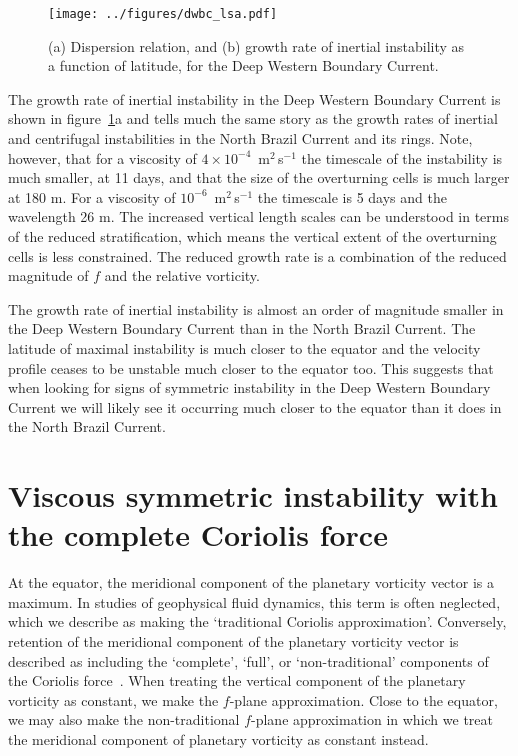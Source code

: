 \begin{figure}
    \centering
    \texttt{[image: ../figures/dwbc\_lsa.pdf]}
    \caption{(a) Dispersion relation, and (b) growth rate of inertial instability as a function of latitude, for the Deep Western Boundary Current.}
    \label{fig:lsaDWBC}
\end{figure}

The growth rate of inertial instability in the Deep Western Boundary Current is shown in figure~\ref{fig:lsaDWBC}a and tells much the same story as the growth rates of inertial and centrifugal instabilities in the North Brazil Current and its rings. Note, however, that for a viscosity of $4 \times 10^{-4}$~m$^2\,$s$^{-1}$ the timescale of the instability is much smaller, at 11 days, and that the size of the overturning cells is much larger at 180 m. For a viscosity of $10^{-6}$~m$^2\,$s$^{-1}$ the timescale is 5 days and the wavelength 26 m. The increased vertical length scales can be understood in terms of the reduced stratification, which means the vertical extent of the overturning cells is less constrained. The reduced growth rate is a combination of the reduced magnitude of $f$ and the relative vorticity.

The growth rate of inertial instability is almost an order of magnitude smaller in the Deep Western Boundary Current than in the North Brazil Current. The latitude of maximal instability is much closer to the equator and the velocity profile ceases to be unstable much closer to the equator too. This suggests that when looking for signs of symmetric instability in the Deep Western Boundary Current we will likely see it occurring much closer to the equator than it does in the North Brazil Current.

\section{Viscous symmetric instability with the complete Coriolis force}
\label{sec:DrasticSI}
    At the equator, the meridional component of the planetary vorticity vector is a maximum. In studies of geophysical fluid dynamics, this term is often neglected, which we describe as making the `traditional Coriolis approximation'. Conversely, retention of the meridional component of the planetary vorticity vector is described as including the `complete', `full', or `non-traditional' components of the Coriolis force~\citep{Stewart2011}. When treating the vertical component of the planetary vorticity as constant, we make the $f$-plane approximation. Close to the equator, we may also make the non-traditional $f$-plane approximation in which we treat the meridional component of planetary vorticity as constant instead.

